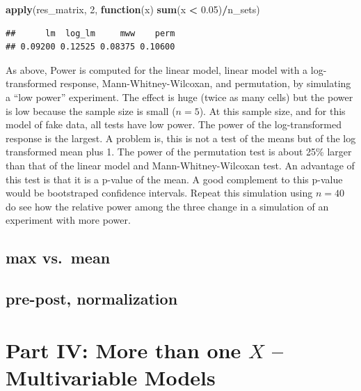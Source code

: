 \documentclass[]{book}
\newenvironment{Shaded}{\begin{snugshade}}{\end{snugshade}}
\newcommand{\ControlFlowTok}[1]{\textcolor[rgb]{0.13,0.29,0.53}{\textbf{#1}}}
\newcommand{\DecValTok}[1]{\textcolor[rgb]{0.00,0.00,0.81}{#1}}
\newcommand{\FloatTok}[1]{\textcolor[rgb]{0.00,0.00,0.81}{#1}}
\newcommand{\KeywordTok}[1]{\textcolor[rgb]{0.13,0.29,0.53}{\textbf{#1}}}
\newcommand{\NormalTok}[1]{#1}
\newcommand{\OperatorTok}[1]{\textcolor[rgb]{0.81,0.36,0.00}{\textbf{#1}}}
\newcommand{\StringTok}[1]{\textcolor[rgb]{0.31,0.60,0.02}{#1}}
\begin{document}
\begin{Shaded}
\begin{Highlighting}[]
\KeywordTok{apply}\NormalTok{(res_matrix, }\DecValTok{2}\NormalTok{, }\ControlFlowTok{function}\NormalTok{(x) }\KeywordTok{sum}\NormalTok{(x }\OperatorTok{<}\StringTok{ }\FloatTok{0.05}\NormalTok{)}\OperatorTok{/}\NormalTok{n_sets)}
\end{Highlighting}
\end{Shaded}

\begin{verbatim}
##      lm  log_lm     mww    perm 
## 0.09200 0.12525 0.08375 0.10600
\end{verbatim}

As above, Power is computed for the linear model, linear model with a log-transformed response, Mann-Whitney-Wilcoxan, and permutation, by simulating a ``low power'' experiment. The effect is huge (twice as many cells) but the power is low because the sample size is small (\(n = 5\)). At this sample size, and for this model of fake data, all tests have low power. The power of the log-transformed response is the largest. A problem is, this is not a test of the means but of the log transformed mean plus 1. The power of the permutation test is about 25\% larger than that of the linear model and Mann-Whitney-Wilcoxan test. An advantage of this test is that it is a p-value of the mean. A good complement to this p-value would be bootstraped confidence intervals. Repeat this simulation using \(n=40\) do see how the relative power among the three change in a simulation of an experiment with more power.

\hypertarget{max-vs.-mean}{%
\section{max vs.~mean}\label{max-vs.-mean}}

\hypertarget{pre-post-normalization}{%
\section{pre-post, normalization}\label{pre-post-normalization}}

\hypertarget{part-iv-more-than-one-x-multivariable-models}{%
\chapter*{\texorpdfstring{Part IV: More than one \(X\) -- Multivariable Models}{Part IV: More than one X -- Multivariable Models}}\label{part-iv-more-than-one-x-multivariable-models}}
\end{document}
